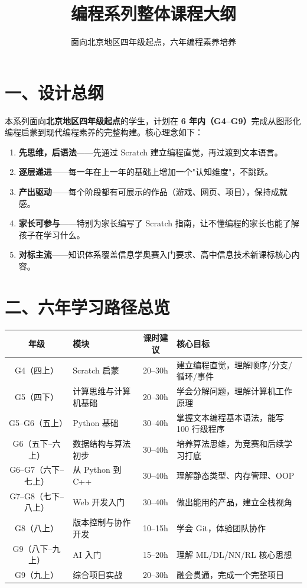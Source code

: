 \documentclass[a4paper,12pt]{ctexart}
\title{\textcolor{blue!70!black}{\Huge\textbf{编程系列整体课程大纲}}}
\author{面向北京地区四年级起点，六年编程素养培养}
\date{}
\begin{document}
\maketitle
\thispagestyle{empty}

\section*{一、设计总纲}

本系列面向\textbf{北京地区四年级起点}的学生，计划在 \textbf{6 年内（G4--G9）}完成从图形化编程启蒙到现代编程素养的完整构建。核心理念如下：

\begin{enumerate}
  \item \textbf{先思维，后语法}——先通过 Scratch 建立编程直觉，再过渡到文本语言。
  \item \textbf{逐层递进}——每一年在上一年的基础上增加一个"认知维度"，不跳跃。
  \item \textbf{产出驱动}——每个阶段都有可展示的作品（游戏、网页、项目），保持成就感。
  \item \textbf{家长可参与}——特别为家长编写了 Scratch 指南，让不懂编程的家长也能了解孩子在学习什么。
  \item \textbf{对标主流}——知识体系覆盖信息学奥赛入门要求、高中信息技术新课标核心内容。
\end{enumerate}

\section*{二、六年学习路径总览}

\vspace{0.3cm}
\begin{center}
\begin{tabular}{|c|l|c|l|}
\hline
\textbf{年级} & \textbf{模块} & \textbf{课时建议} & \textbf{核心目标} \\ \hline
G4（四上） & Scratch 启蒙 & 20--30h & 建立编程直觉，理解顺序/分支/循环/事件 \\ \hline
G5（四下） & 计算思维与计算机基础 & 20--30h & 学会分解问题，理解计算机工作原理 \\ \hline
G5--G6（五上） & Python 基础 & 30--40h & 掌握文本编程基本语法，能写 100 行级程序 \\ \hline
G6（五下--六上） & 数据结构与算法初步 & 30--40h & 培养算法思维，为竞赛和后续学习打底 \\ \hline
G6--G7（六下--七上） & 从 Python 到 C++ & 30--40h & 理解静态类型、内存管理、OOP \\ \hline
G7--G8（七下--八上） & Web 开发入门 & 30--40h & 做出能用的产品，建立全栈视角 \\ \hline
G8（八上） & 版本控制与协作开发 & 10--15h & 学会 Git，体验团队协作 \\ \hline
G9（八下--九上） & AI 入门 & 15--20h & 理解 ML/DL/NN/RL 核心思想 \\ \hline
G9（九上） & 综合项目实战 & 20--30h & 融会贯通，完成一个完整项目 \\ \hline
\end{tabular}
\end{center}
\end{document}
